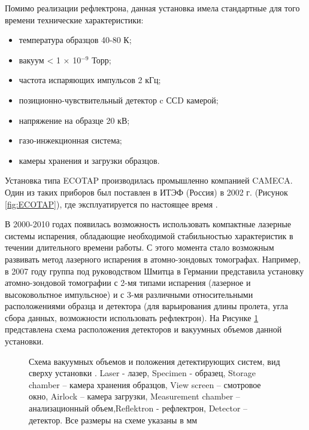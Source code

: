 	
Помимо реализации рефлектрона, данная установка имела стандартные для того времени технические характеристики:
\begin{itemize}[beginpenalty=10000] %
	\item температура образцов 40-80 К;
	\item вакуум < 1 × 10$^{-9}$ Торр; 
	\item частота испаряющих импульсов 2 кГц;
	\item позиционно-чувствительный детектор c ССD камерой;
	\item напряжение на образце 20 кВ; 
	\item газо-инжекционная система;
	\item камеры хранения и загрузки образцов.
\end{itemize}


Установка типа ECOTAP производилась промышленно компанией CAMECA. Один из таких приборов был поставлен в ИТЭФ (Россия) в 2002 г. (Рисунок \cref{fig:ECOTAP}), где эксплуатируется по настоящее время \cite{Suvorov06}.

В 2000-2010 годах появилась возможность использовать компактные лазерные системы испарения, обладающие необходимой стабильностью характеристик в течении длительного времени работы. С этого момента стало возможным развивать метод лазерного  испарения в атомно-зондовых томографах. Например, в 2007 году группа под руководством Шмитца в Германии \cite{Stender07} представила установку атомно-зондовой томографии с 2-мя типами испарения (лазерное и высоковольтное импульсное) и с 3-мя различными относительными расположениями образца и детектора (для варьирования длины пролета, угла сбора данных, возможности использовать рефлектрон). На Рисунке \cref{fig:Schmitz} представлена схема расположения детекторов и вакуумных объемов данной установки. 

\begin{figure}[htb]
	\caption{Схема вакуумных объемов и положения детектирующих систем, вид сверху установки \cite{Stender07}.  Laser - лазер, Specimen - образец, Storage chamber – камера хранения образцов, View screen – смотровое окно, Airlock – камера загрузки, Measurement chamber – анализационный объем,Reflektron - рефлектрон, Detector – детектор. Все размеры на схеме указаны в мм}
	\label{fig:Schmitz}
\end{figure}

